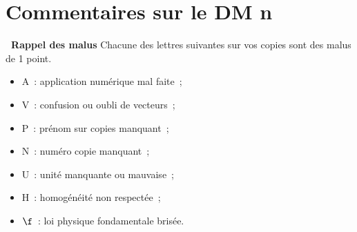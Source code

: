\documentclass[a4paper, 10pt, final, garamond]{book}
\begin{document}
\setcounter{chapter}{3}

\chapter{Commentaires sur le DM n}

\begin{NCprop}[width=\linewidth]{\centering\bfseries\ Rappel des malus}
    Chacune des lettres suivantes sur vos copies sont des malus de \num{1}
    point.\smallbreak
    \begin{minipage}{0.50\linewidth}
        \begin{itemize}
            \item A~: application numérique mal faite~;
            \item V~: confusion ou oubli de vecteurs~;
            \item P~: prénom sur copies manquant~;
            \item N~: numéro copie manquant~;
        \end{itemize}
    \end{minipage}
    \begin{minipage}{0.50\linewidth}
        \begin{itemize}
            \item U~: unité manquante ou mauvaise~;
            \item H~: homogénéité non respectée~;
            \item $\f$~: loi physique fondamentale brisée.
        \end{itemize}
    \end{minipage}
\end{NCprop}
\end{document}
